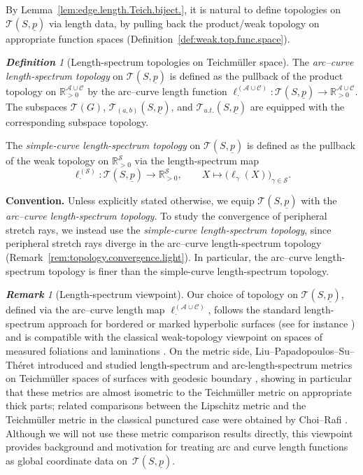 \documentclass[11pt, letterpaper]{amsart}
\theoremstyle{definition}
\theoremstyle{remark}
\newtheorem{definition}[theorem]{\rm\bf Definition}
\newtheorem{remark}[theorem]{\rm\bf Remark}
\newcommand{\up}{\underline{p}}
\newcommand{\Sp}{(S,\up)}
\newcommand{\lAC}{\ell^{(\cAC)}}
\newcommand{\cAC}{\mathcal{A} \cup \mathcal{C}}
\newcommand{\cT}{\mathcal{T}}
\newcommand{\cTp}{\mathcal{T} (S,\up)}
\newcommand{\bR}{\mathbb{R}}
\newcommand{\cS}{\mathcal{S}}
\newcommand{\DEF}{} \newcommand{\WARN}{\textcolor{red}} \newcommand{\ALT}{\textcolor{brown}} \newcommand{\TODO}{\textcolor{teal}} %
\numberwithin{equation}{section}
\begin{document}
By Lemma~\ref{lem:edge.length.Teich.biject.}, it is natural to define topologies on \(\cTp\)
via length data, by pulling back the product/weak topology on appropriate function spaces
(Definition~\ref{def:weak.top.func.space}).

\begin{definition}[Length-spectrum topologies on Teichm\"uller space]
\label{def:topology.on.T}
The \DEF{\em arc--curve length-spectrum topology} on \(\cTp\) is defined as the pullback of the product topology on
\(\bR^{\cAC}_{>0}\) by the arc--curve length function \(\lAC_{\cdot}: \cTp\longrightarrow \bR^{\cAC}_{>0}\).
The subspaces \(\cT(G)\), \(\cT_{(a,b)}\Sp\), and \(\cT_{u.t.}\Sp\) are equipped with the corresponding subspace topology.

The \DEF{\em simple-curve length-spectrum topology} on \(\cTp\) is defined as the pullback of the weak topology on
\(\bR^{\cS}_{>0}\) via the length-spectrum map
\[
  \ell^{(\cS)}_{\cdot}:\cTp\longrightarrow \bR^{\cS}_{>0},\qquad
  X\longmapsto \bigl(\ell_\gamma(X)\bigr)_{\gamma\in\cS}.
\]
\end{definition}

\smallskip
\noindent\textbf{Convention.}
Unless explicitly stated otherwise, we equip \(\cTp\) with the \emph{arc--curve length-spectrum topology}.
To study the convergence of peripheral stretch rays, we instead use the \emph{simple-curve length-spectrum topology}, since peripheral stretch rays diverge in the arc--curve length-spectrum topology (Remark~\ref{rem:topology.convergence.light}).
In particular, the arc--curve length-spectrum topology is finer than the simple-curve length-spectrum topology.

\begin{remark}[Length-spectrum viewpoint]
Our choice of topology on \(\cTp\), defined via the arc--curve length map
\(\lAC_{\cdot}\), follows the standard length-spectrum approach for bordered or
marked hyperbolic surfaces (see for instance \cite{LPST10}) and is compatible
with the classical weak-topology viewpoint on spaces of measured foliations and
laminations \cite{FLP12}.  
On the metric side, Liu--Papadopoulos--Su--Th\'eret
introduced and studied length-spectrum and arc-length-spectrum metrics on
Teichm\"uller spaces of surfaces with geodesic boundary \cite{LPST10},
showing in particular that these metrics are almost isometric to the
Teichm\"uller metric on appropriate thick parts; related comparisons between
the Lipschitz metric and the Teichm\"uller metric in the classical punctured
case were obtained by Choi--Rafi \cite{CR07}.  
Although we will not use these metric comparison results directly, this
viewpoint provides background and motivation for treating arc and curve length
functions as global coordinate data on~\(\cTp\).
\end{remark}
\end{document}
